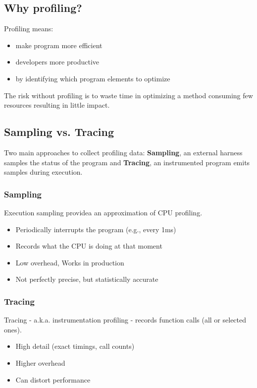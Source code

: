 \subsection{Why profiling?}
Profiling means:

\begin{itemize}
  \item make program more efficient
  \item developers more productive
  \item by identifying which program elements to optimize
\end{itemize}

The risk without profiling is to waste time in optimizing a
method consuming few resources resulting in little impact.

\subsection{Sampling vs. Tracing}
Two main approaches to collect profiling data: \textbf{Sampling}, an external harness samples the status of the program and
\textbf{Tracing}, an instrumented program emits samples during execution.

\subsubsection{Sampling}
Execution sampling providea an approximation of CPU
profiling.

\begin{itemize}
  \item Periodically interrupts the program (e.g., every 1ms)
  \item Records what the CPU is doing at that moment
  \item Low overhead, Works in production
  \item Not perfectly precise, but statistically accurate
\end{itemize}

\subsubsection{Tracing}

Tracing - a.k.a. instrumentation profiling - records function
calls (all or selected ones).

\begin{itemize}
  \item High detail (exact timings, call counts)
  \item Higher overhead
  \item Can distort performance
\end{itemize}

